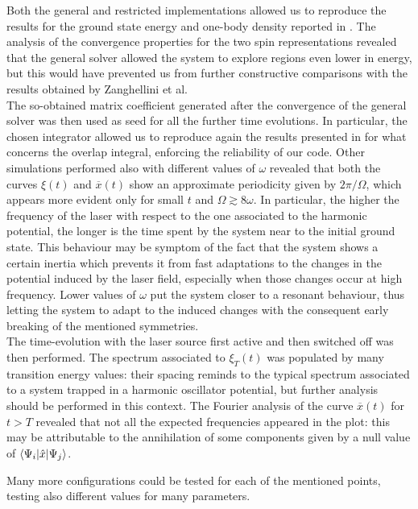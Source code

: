 Both the general and restricted implementations allowed us to reproduce the results for the ground state energy and one-body density reported in \cite{Zanghellini_2004}. The analysis of the convergence properties for the two spin representations revealed that the general solver allowed the system to explore regions even lower in energy, but this would have prevented us from further constructive comparisons with the results obtained by Zanghellini et al. \\

The so-obtained matrix coefficient generated after the convergence of the general solver was then used as seed for all the further time evolutions. In particular, the chosen integrator allowed us to reproduce again the results presented in \cite{Zanghellini_2004} for what concerns the overlap integral, enforcing the reliability of our code. Other simulations performed also with different values of $\omega$ revealed that both the curves $\xi(t)$ and $\overline{x}(t)$ show an approximate periodicity given by $2\pi/\Omega$, which appears more evident only for small $t$ and $\Omega \gtrsim 8\omega$. In particular, the higher the frequency of the laser with respect to the one associated to the harmonic potential, the longer is the time spent by the system near to the initial ground state. This behaviour may be symptom of the fact that the system shows a certain inertia which prevents it from fast adaptations to the changes in the potential induced by the laser field, especially when those changes occur at high frequency. Lower values of $\omega$ put the system closer to a resonant behaviour, thus letting the system to adapt to the induced changes with the consequent early breaking of the mentioned symmetries. \\

The time-evolution with the laser source first active and then switched off was then performed. The spectrum associated to $\xi_T(t)$ was populated by many transition energy values: their spacing reminds to the typical spectrum associated to a system trapped in a harmonic oscillator potential, but further analysis should be performed in this context. The Fourier analysis of the curve $\overline{x}(t)$ for $t>T$ revealed that not all the expected frequencies appeared in the plot: this may be attributable to the annihilation of some components given by a null value of $\bracketOP{\Psi_i}{\Psi_j}{\hat{x}}$. 

Many more configurations could be tested for each of the mentioned points, testing also different values for many parameters.



